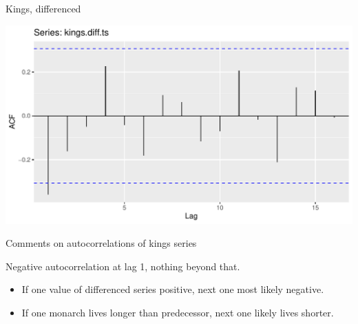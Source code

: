 \documentclass[ignorenonframetext,]{beamer}
\newenvironment{Shaded}{\begin{snugshade}}{\end{snugshade}}
\newcommand{\DataTypeTok}[1]{\textcolor[rgb]{0.13,0.29,0.53}{#1}}
\newcommand{\KeywordTok}[1]{\textcolor[rgb]{0.13,0.29,0.53}{\textbf{#1}}}
\newcommand{\NormalTok}[1]{#1}
\newcommand{\OperatorTok}[1]{\textcolor[rgb]{0.81,0.36,0.00}{\textbf{#1}}}
\newcommand{\StringTok}[1]{\textcolor[rgb]{0.31,0.60,0.02}{#1}}
\providecommand{\tightlist}{%
  \setlength{\itemsep}{0pt}\setlength{\parskip}{0pt}}
\begin{document}
\begin{frame}[fragile]{Kings, differenced}
\protect\hypertarget{kings-differenced}{}

\begin{Shaded}
\end{Shaded}

\includegraphics{figure/unnamed-chunk-586-1.pdf}

\end{frame}

\begin{frame}{Comments on autocorrelations of kings series}
\protect\hypertarget{comments-on-autocorrelations-of-kings-series}{}

Negative autocorrelation at lag 1, nothing beyond that.

\begin{itemize}
\tightlist
\item
  If one value of differenced series positive, next one most likely
  negative.
\item
  If one monarch lives longer than predecessor, next one likely lives
  shorter.
\end{itemize}

\end{frame}
\end{document}
